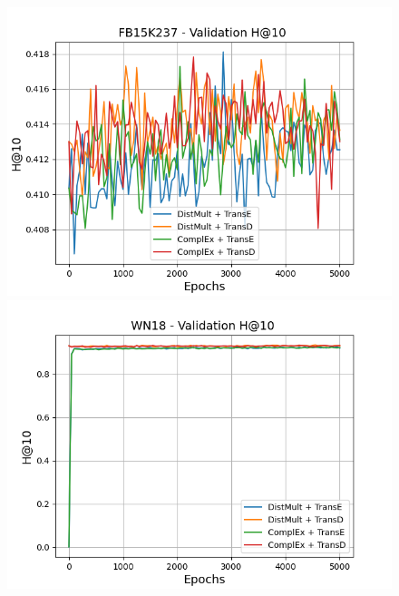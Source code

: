 \begin{figure}
    \begin{minipage}{.3\textwidth}
      \centering
      \includegraphics[width=\linewidth]{figures/results/gan_train/pretrained/uncertainty/max_distribution/entropy/fb15k237/5k_epochs/uncertainty_fb15k237_hit10.png}
    \end{minipage}%
     \begin{minipage}{.3\textwidth}
      \centering
      \includegraphics[width=0.9\linewidth]{figures/results/gan_train/pretrained/uncertainty/max_distribution/entropy/wn18/5k_epochs/uncertainty_wn18_hit10.png}
    \end{minipage}%
     \begin{minipage}{.3\textwidth}
      \centering

\end{minipage}
\end{figure}
